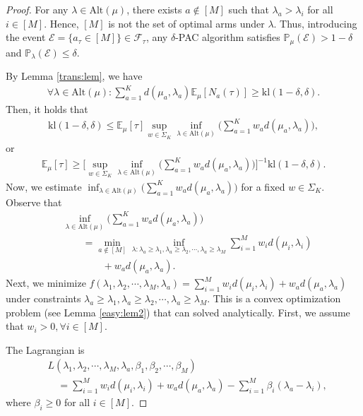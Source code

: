 \documentclass[final]{IEEEtran}
\newcommand{\nn}{\nonumber}
\newcommand{\calE}{\mathcal{E}}
\newcommand{\calF}{\mathcal{F}}
\newcommand{\bbE}{\mathbb{E}}
\newcommand{\bbP}{\mathbb{P}}
\begin{document}
\begin{proof}
For any $\lambda \in \text{Alt}(\mu)$, there exists $a \notin [M]$ such that $\lambda_a> \lambda_i$ for all $i \in [M]$. Hence, $[M]$ is not the set of optimal arms under $\lambda$.  Thus, introducing the event $\calE=\{\hat{a}_{\tau} \in [M]\} \in \calF_{\tau}$, any $\delta$-PAC algorithm satisfies $\bbP_{\mu}(\calE)>1-
\delta$ and $\bbP_{\lambda}(\calE)\leq \delta$. 

By Lemma \ref{trans:lem}, we have
\begin{align}
\forall \lambda \in \text{Alt}(\mu):  \sum_{a=1}^K d(\mu_a,\lambda_a) \bbE_{\mu}[N_a(\tau)]\geq \text{kl}(1-\delta,\delta). 
\end{align} 
Then, it holds that
\begin{align}
 \text{kl}(1-\delta,\delta)\leq \bbE_{\mu}[\tau] \sup_{w \in \Sigma_K} \inf_{\lambda \in \text{Alt}(\mu)} \bigg(\sum_{a=1}^K w_a d(\mu_a,\lambda_a)\bigg), 
\end{align}
or
\begin{align}
 \bbE_{\mu}[\tau] \geq \bigg[\sup_{w \in \Sigma_K} \inf_{\lambda \in \text{Alt}(\mu)} \bigg(\sum_{a=1}^K w_a d(\mu_a,\lambda_a)\bigg)\bigg]^{-1} \text{kl}(1-\delta,\delta). 
\end{align}
Now, we estimate $ \inf_{\lambda \in \text{Alt}(\mu)} \big(\sum_{a=1}^K w_a d(\mu_a,\lambda_a)\big)$ for a fixed $w \in \Sigma_K$.  Observe that
\begin{align}
& \inf_{\lambda \in \text{Alt}(\mu)} \bigg(\sum_{a=1}^K w_a d(\mu_a,\lambda_a)\bigg)\nn\\
& \qquad =\min_{a \notin [M]} \inf_{\lambda: \lambda_a\geq \lambda_1, \lambda_a \geq \lambda_2, \cdots, \lambda_a \geq \lambda_M} \sum_{i=1}^M w_i d(\mu_i,\lambda_i)\nn\\
&\qquad \qquad + w_a d(\mu_a,\lambda_a).
\end{align}
Next, we minimize $f(\lambda_1,\lambda_2,\cdots, \lambda_M,\lambda_a)=\sum_{i=1}^M w_i d(\mu_i,\lambda_i)+ w_a d(\mu_a,\lambda_a)$ under constraints $\lambda_a \geq \lambda_1, \lambda_a \geq \lambda_2, \cdots, \lambda_a\geq  \lambda_M$. This is a convex optimization problem (see Lemma \ref{easy:lem2}) that can solved analytically. First, we assume that $w_i>0, \forall i \in [M]$. 

The Lagrangian is
\begin{align}
&L(\lambda_1,\lambda_2,\cdots,\lambda_M,\lambda_a, \beta_1,\beta_2, \cdots, \beta_M)\nn\\
&\quad =\sum_{i=1}^M w_i d(\mu_i,\lambda_i)+ w_a d(\mu_a,\lambda_a)- \sum_{i=1}^M \beta_i (\lambda_a-\lambda_i),
\end{align} where $\beta_i \geq 0$ for all $i \in [M]$.  


\end{proof}
\end{document}
